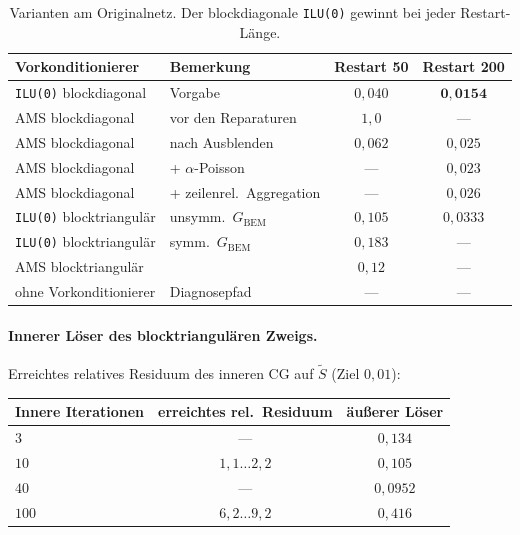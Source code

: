 \documentclass[11pt,a4paper]{article}
\newcommand{\code}[1]{\texttt{\small #1}}
\begin{document}
\begin{table}[h]
\centering
\begin{tabular}{llcc}
\toprule
Vorkonditionierer & Bemerkung & Restart 50 & Restart 200 \\
\midrule
\code{ILU(0)} blockdiagonal   & Vorgabe                       & $0{,}040$ & $\mathbf{0{,}0154}$ \\
AMS blockdiagonal             & vor den Reparaturen           & $1{,}0$   & --- \\
AMS blockdiagonal             & nach Ausblenden               & $0{,}062$ & $0{,}025$ \\
AMS blockdiagonal             & + $\alpha$-Poisson            & ---       & $0{,}023$ \\
AMS blockdiagonal             & + zeilenrel.\ Aggregation     & ---       & $0{,}026$ \\
\code{ILU(0)} blocktriangulär & unsymm.\ $G_{\mathrm{BEM}}$   & $0{,}105$ & $0{,}0333$ \\
\code{ILU(0)} blocktriangulär & symm.\ $G_{\mathrm{BEM}}$     & $0{,}183$ & --- \\
AMS blocktriangulär           &                               & $0{,}12$  & --- \\
ohne Vorkonditionierer        & Diagnosepfad                  & ---       & --- \\
\bottomrule
\end{tabular}
\caption{Varianten am Originalnetz. Der blockdiagonale \code{ILU(0)} gewinnt
bei jeder Restart-Länge.}
\end{table}

\paragraph{Innerer Löser des blocktriangulären Zweigs.}
Erreichtes relatives Residuum des inneren CG auf $\tilde S$ (Ziel $0{,}01$):

\begin{center}
\begin{tabular}{lcc}
\toprule
Innere Iterationen & erreichtes rel.\ Residuum & äußerer Löser \\
\midrule
$3$   & ---              & $0{,}134$ \\
$10$  & $1{,}1\dots2{,}2$ & $0{,}105$ \\
$40$  & ---              & $0{,}0952$ \\
$100$ & $6{,}2\dots9{,}2$ & $0{,}416$ \\
\bottomrule
\end{tabular}
\end{center}
\end{document}
